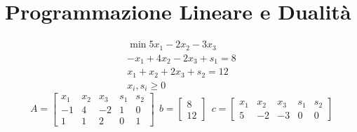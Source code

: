 \chapter{Programmazione Lineare e Dualità}
\newcommand\scalemath[2]{\scalebox{#1}{\mbox{\ensuremath{\displaystyle #2}}}}

\Es
\begin{gather*}
\min 5x_{1} -2x_{2} -3x_{3}\\
-x_{1} +4x_{2} -2x_{3} +s_{1} =8\\
x_{1} +x_{2} +2x_{3} +s_{2} =12\\
x_{i} ,s_{i} \geq 0
\end{gather*}
\begin{equation*}
A=\begin{bmatrix}
x_{1} & x_{2} & x_{3} & s_{1} & s_{2}\\
-1 & 4 & -2 & 1 & 0\\
1 & 1 & 2 & 0 & 1
\end{bmatrix} \ \ b=\begin{bmatrix}
8\\
12
\end{bmatrix} \ \ c=\begin{bmatrix}
x_{1} & x_{2} & x_{3} & s_{1} & s_{2}\\
5 & -2 & -3 & 0 & 0
\end{bmatrix}
\end{equation*}

